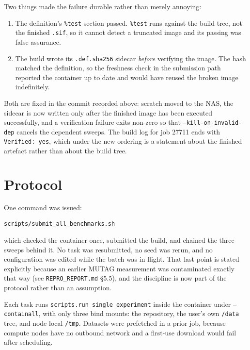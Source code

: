 \documentclass[11pt,a4paper]{article}
\begin{document}
Two things made the failure durable rather than merely annoying:

\begin{enumerate}
\item The definition's \texttt{\%test} section passed. \texttt{\%test} runs against the build tree,
      not the finished \texttt{.sif}, so it cannot detect a truncated image and its passing was
      false assurance.
\item The build wrote its \texttt{.def.sha256} sidecar \emph{before} verifying the image. The hash
      matched the definition, so the freshness check in the submission path reported the container
      up to date and would have reused the broken image indefinitely.
\end{enumerate}

Both are fixed in the commit recorded above: scratch moved to the NAS, the sidecar is now written
only after the finished image has been executed successfully, and a verification failure exits
non-zero so that \texttt{--kill-on-invalid-dep} cancels the dependent sweeps. The build log for job
27711 ends with \texttt{Verified: yes}, which under the new ordering is a statement about the
finished artefact rather than about the build tree.

\section{Protocol}

One command was issued:

\begin{verbatim}
scripts/submit_all_benchmarks.sh
\end{verbatim}

which checked the container once, submitted the build, and chained the three sweeps behind it. No
task was resubmitted, no seed was rerun, and no configuration was edited while the batch was in
flight. That last point is stated explicitly because an earlier MUTAG measurement was contaminated
exactly that way (see \texttt{REPRO\_REPORT.md} \S5.5), and the discipline is now part of the
protocol rather than an assumption.

Each task runs \texttt{scripts.run\_single\_experiment} inside the container under
\texttt{--containall}, with only three bind mounts: the repository, the user's own \texttt{/data}
tree, and node-local \texttt{/tmp}. Datasets were prefetched in a prior job, because compute nodes
have no outbound network and a first-use download would fail after scheduling.
\end{document}
